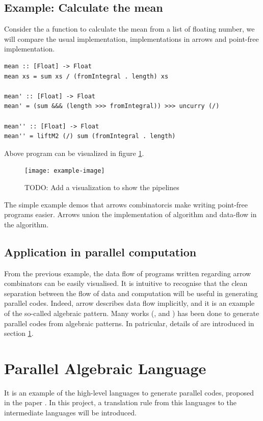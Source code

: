 \subsection{Example: Calculate the mean}
Consider the a function to calculate the mean from a list of floating number, we will compare the usual implementation, implementations in arrows and point-free implementation.
\begin{verbatim}
mean :: [Float] -> Float
mean xs = sum xs / (fromIntegral . length) xs

mean' :: [Float] -> Float
mean' = (sum &&& (length >>> fromIntegral)) >>> uncurry (/)

mean'' :: [Float] -> Float
mean'' = liftM2 (/) sum (fromIntegral . length)
\end{verbatim}
Above program can be visualized in figure \ref{b:ar:p2}.
\begin{figure}[ht]
  \centering
  \texttt{[image: example-image]} 
  \caption{TODO: Add a visualization to show the pipelines}\label{b:ar:p2}
\end{figure}
The simple example demos that arrows combinatorcis make writing point-free programs easier. Arrows union the implementation of algorithm and data-flow in the algorithm. 

\subsection{Application in parallel computation}
From the previous example, the data flow of programs written regarding arrow combinators can be easily visualised. It is intuitive to recognise that the clean separation between the flow of data and computation will be useful in generating parallel codes. Indeed, arrow describes data flow implicitly, and it is an example of the so-called algebraic pattern. Many works (\cite{braunArrowsParallelComputation2018}, \cite{elliottGenericFunctionalParallel2017b} and \cite{authorAlgebraicMultipartyProtocol2018}) has been done to generate parallel codes from algebraic patterns.
In patricular, details of \cite{authorAlgebraicMultipartyProtocol2018} are introduced in section \ref{b:pal}.
\section{Parallel Algebraic Language} \label{b:pal}
It is an example of the high-level languages to generate parallel codes, proposed in the paper \cite{authorAlgebraicMultipartyProtocol2018}. In this project, a translation rule from this languages to the intermediate languages will be introduced.
